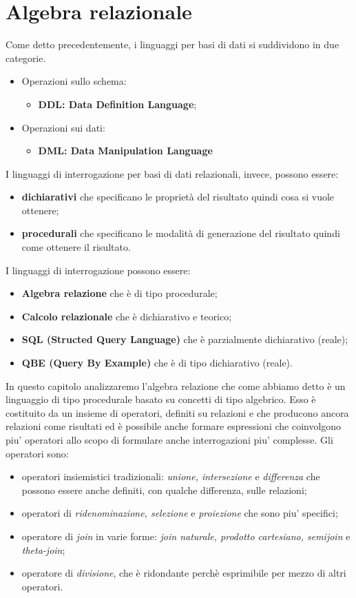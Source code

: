 \documentclass[12pt]{report}
\begin{document}
 	\chapter{Algebra relazionale}
 	Come detto precedentemente, i linguaggi per basi di dati si suddividono in due categorie.
 	\begin{itemize}
 		\item Operazioni sullo schema:
 		\begin{itemize}
 			\item \textbf{DDL: Data Definition Language};
 		\end{itemize}
 		\item Operazioni sui dati:
 		\begin{itemize}
 			\item \textbf{DML: Data Manipulation Language}
 		\end{itemize}
 	\end{itemize}
 	I linguaggi di interrogazione per basi di dati relazionali, invece, possono essere:
 	\begin{itemize}
 		\item \textbf{dichiarativi} che specificano le proprietà del risultato quindi cosa si vuole ottenere;
 		\item \textbf{procedurali} che specificano le modalità di generazione del risultato quindi come ottenere il risultato.
 	\end{itemize}
 	I linguaggi di interrogazione possono essere:
 	\begin{itemize}
 		\item \textbf{Algebra relazione} che è di tipo procedurale;
 		\item \textbf{Calcolo relazionale} che è dichiarativo e teorico;
 		\item \textbf{SQL (Structed Query Language)} che è parzialmente dichiarativo (reale);
 		\item \textbf{QBE (Query By Example)} che è di tipo dichiarativo (reale).
 	\end{itemize}
 	In questo capitolo analizzaremo l'algebra relazione che come abbiamo detto è un linguaggio di tipo procedurale basato su concetti di tipo algebrico. Esso è costituito da un insieme di operatori, definiti su relazioni e che producono ancora relazioni come risultati ed è possibile anche formare espressioni che coinvolgono piu' operatori allo scopo di formulare anche interrogazioni piu' complesse. Gli operatori sono:
 	\begin{itemize}
 		\item operatori insiemistici tradizionali: \textit{unione, intersezione} e \textit{differenza} che possono essere anche definiti, con qualche differenza, sulle relazioni;
 		\item operatori di \textit{ridenominazione, selezione} e \textit{proiezione} che sono piu' specifici;
 		\item operatore di \textit{join} in varie forme: \textit{join naturale, prodotto cartesiano, semijoin} e \textit{theta-join};
 		\item operatore di \textit{divisione}, che è ridondante perchè esprimibile per mezzo di altri operatori.
 	\end{itemize}
\end{document}
